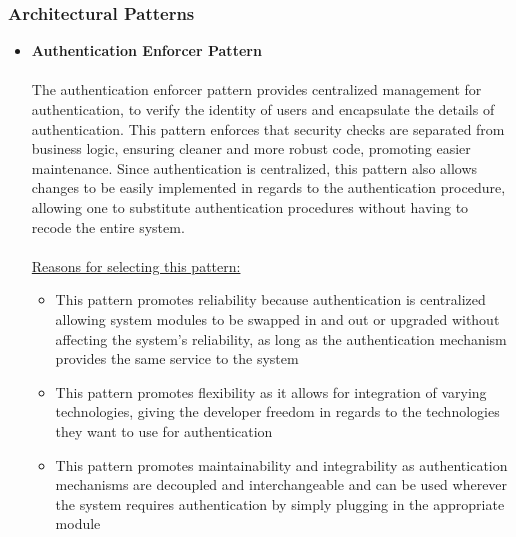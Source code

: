 \documentclass[a4paper,10pt]{article}
\begin{document}
\subsubsection{Architectural Patterns}
\begin{itemize}
	\item \textbf {Authentication Enforcer Pattern} \\\\
	The authentication enforcer pattern provides centralized management for authentication, to verify the identity of users and encapsulate the details of authentication. This pattern enforces that security checks are separated from business logic, ensuring cleaner and more robust code, promoting easier maintenance. Since 	authentication is centralized, this pattern also allows changes to be easily implemented in regards to the authentication procedure, allowing one to substitute authentication procedures without having to recode the entire system. \\\\
	\underline{Reasons for selecting this pattern:}
	\begin{itemize}
		\item This pattern promotes reliability because authentication is centralized allowing system modules to be swapped in and out or upgraded without affecting the system’s reliability, as long as the authentication mechanism provides the same service to the system
		\item This pattern promotes flexibility as it allows for integration of varying technologies, giving the developer freedom in regards to the technologies they want to use for authentication
		\item This pattern promotes maintainability and integrability as authentication mechanisms are decoupled and interchangeable and can be used wherever the system requires authentication by simply plugging in the appropriate module\\
	\end{itemize}
	

\end{itemize}
\end{document}

